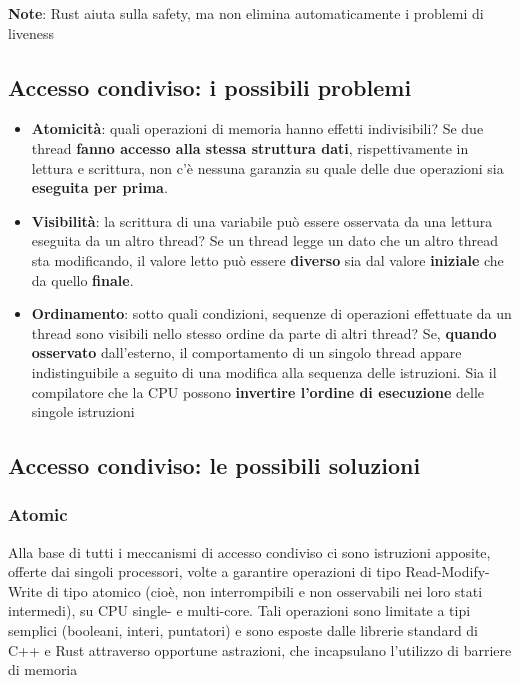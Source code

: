 \begin{tcolorbox}
  \textbf{Note}:  Rust aiuta sulla safety, ma non elimina automaticamente i problemi di liveness
\end{tcolorbox}


\subsection{Accesso condiviso: i possibili problemi}

\begin{itemize}
  \item \textbf{Atomicità}: quali operazioni di memoria hanno effetti indivisibili? Se
        due thread \textbf{fanno accesso alla stessa struttura dati}, rispettivamente in
        lettura e scrittura, non c'è nessuna garanzia su quale delle due
        operazioni sia \textbf{eseguita per prima}.
  \item \textbf{Visibilità}: la scrittura di una variabile può essere osservata da una lettura eseguita
        da un altro thread? Se un thread legge un dato che un altro thread sta modificando, il valore letto può essere
        \textbf{diverso} sia dal valore \textbf{iniziale} che da quello \textbf{finale}.
  \item \textbf{Ordinamento}: sotto quali condizioni, sequenze di operazioni effettuate
        da un thread sono visibili nello stesso ordine da parte di altri thread? Se,
        \textbf{quando osservato} dall'esterno, il comportamento di un singolo thread appare
        indistinguibile a seguito di una modifica alla sequenza delle istruzioni. Sia il compilatore che la CPU possono \textbf{invertire l'ordine di
          esecuzione} delle singole istruzioni
\end{itemize}


\subsection{Accesso condiviso: le possibili soluzioni}

\subsubsection{Atomic}

Alla base di tutti i meccanismi di accesso condiviso ci sono istruzioni apposite,
offerte dai singoli processori, volte a garantire operazioni di tipo
Read-Modify-Write di tipo atomico (cioè, non interrompibili e non osservabili
nei loro stati intermedi), su CPU single- e multi-core. Tali operazioni sono
limitate a tipi semplici (booleani, interi, puntatori) e sono esposte dalle
librerie standard di C++ e Rust attraverso opportune astrazioni, che incapsulano
l'utilizzo di barriere di memoria



